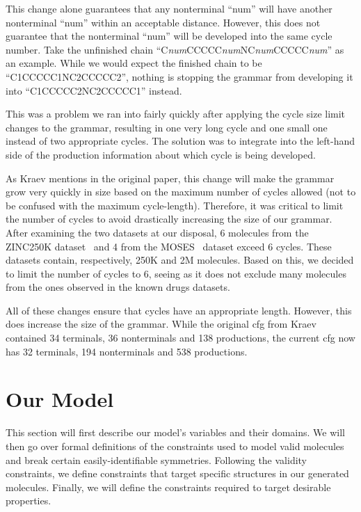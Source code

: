 \documentclass[../Document.tex]{subfiles}
\begin{document}
This change alone guarantees that any nonterminal ``num'' will have another nonterminal ``num'' within an acceptable distance. However, this does not guarantee that the nonterminal ``num'' will be developed into the same cycle number. Take the unfinished chain ``C\textit{num}CCCCC\textit{num}NC\textit{num}CCCCC\textit{num}'' as an example. While we would expect the finished chain to be ``C1CCCCC1NC2CCCCC2'', nothing is stopping the grammar from developing it into ``C1CCCCC2NC2CCCCC1'' instead.

This was a problem we ran into fairly quickly after applying the cycle size limit changes to the grammar, resulting in one very long cycle and one small one instead of two appropriate cycles. The solution was to integrate into the left-hand side of the production information about which cycle is being developed.

As Kraev mentions in the original paper\cite{kraev2018grammars}, this change will make the grammar grow very quickly in size based on the maximum number of cycles allowed (not to be confused with the maximum cycle-length).
Therefore, it was critical to limit the number of cycles to avoid drastically increasing the size of our grammar.
After examining the two datasets at our disposal, 6 molecules from the ZINC250K dataset~\cite{Akhmetshin2021} and 4 from the MOSES~\cite{MOSES} dataset exceed 6 cycles. These datasets contain, respectively, 250K and 2M molecules. Based on this, we decided to limit the number of cycles to 6, seeing as it does not exclude many molecules from the ones observed in the known drugs datasets.

All of these changes ensure that cycles have an appropriate length. However, this does increase the size of the grammar. While the original \gls{cfg} from Kraev contained 34 terminals, 36 nonterminals and 138 productions, the current \gls{cfg} now has 32 terminals, 194 nonterminals and 538 productions.


\section{Our Model}
This section will first describe our model's variables and their domains.
We will then go over formal definitions of the constraints used to model valid molecules and break certain easily-identifiable symmetries.
Following the validity constraints, we define constraints that target specific structures in our generated molecules.
Finally, we will define the constraints required to target desirable properties.
\end{document}
